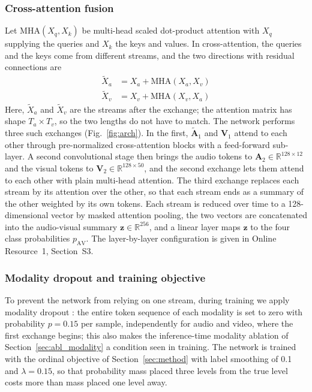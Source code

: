 \documentclass[pdflatex,iicol,sn-basic]{sn-jnl}
\begin{document}
\subsubsection{Cross-attention fusion}\label{sec:xattn}

Let $\mathrm{MHA}(X_q, X_k)$ be multi-head scaled dot-product attention \citep{vaswani2017attention} with $X_q$ supplying the queries and $X_k$ the keys and values. In cross-attention, the queries and the keys come from different streams, and the two directions with residual connections are
\begin{align}
\tilde{X}_a &= X_a + \mathrm{MHA}(X_a, X_v) \label{eq:xattn_a}\\
\tilde{X}_v &= X_v + \mathrm{MHA}(X_v, X_a) \label{eq:xattn_v}
\end{align}
Here, $\tilde{X}_a$ and $\tilde{X}_v$ are the streams after the exchange; the attention matrix has shape $T_a \times T_v$, so the two lengths do not have to match. The network performs three such exchanges (Fig.~\ref{fig:arch}). In the first, $\tilde{\mathbf{A}}_1$ and $\mathbf{V}_1$ attend to each other through pre-normalized cross-attention blocks with a feed-forward sub-layer. A second convolutional stage then brings the audio tokens to $\mathbf{A}_2 \in \mathbb{R}^{128 \times 12}$ and the visual tokens to $\mathbf{V}_2 \in \mathbb{R}^{128 \times 50}$, and the second exchange lets them attend to each other with plain multi-head attention. The third exchange replaces each stream by its attention over the other, so that each stream ends as a summary of the other weighted by its own tokens. Each stream is reduced over time to a 128-dimensional vector by masked attention pooling, the two vectors are concatenated into the audio-visual summary $\mathbf{z} \in \mathbb{R}^{256}$, and a linear layer maps $\mathbf{z}$ to the four class probabilities $p_{\mathrm{AV}}$. The layer-by-layer configuration is given in Online Resource~1, Section~S3.

\subsubsection{Modality dropout and training objective}\label{sec:dropout}

To prevent the network from relying on one stream, during training we apply modality dropout \citep{chumachenko2022selfattention}: the entire token sequence of each modality is set to zero with probability $p = 0.15$ per sample, independently for audio and video, where the first exchange begins; this also makes the inference-time modality ablation of Section~\ref{sec:abl_modality} a condition seen in training. The network is trained with the ordinal objective of Section~\ref{sec:method} with label smoothing of 0.1 and $\lambda = 0.15$, so that probability mass placed three levels from the true level costs more than mass placed one level away.
\end{document}
